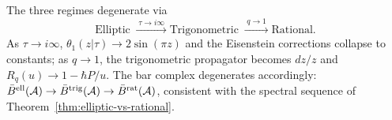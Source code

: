 \begin{remark}\label{rem:degeneration-limits}
The three regimes degenerate via
\begin{equation}\label{eq:degeneration-chain}
\text{Elliptic} \;\xrightarrow{\;\tau \to i\infty\;}
\text{Trigonometric} \;\xrightarrow{\;q \to 1\;}
\text{Rational}.
\end{equation}
As $\tau \to i\infty$, $\theta_1(z|\tau) \to 2\sin(\pi z)$ and the Eisenstein corrections collapse to constants; as $q \to 1$, the trigonometric propagator becomes $dz/z$ and $R_q(u) \to 1 - \hbar P/u$.  The bar complex degenerates accordingly: $\bar{B}^{\mathrm{ell}}(\mathcal{A}) \to \bar{B}^{\mathrm{trig}}(\mathcal{A}) \to \bar{B}^{\mathrm{rat}}(\mathcal{A})$, consistent with the spectral sequence of Theorem~\ref{thm:elliptic-vs-rational}.
\end{remark}
